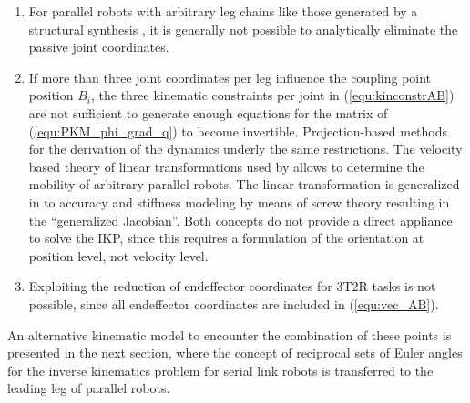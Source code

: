 \documentclass[robotics,article,submit,moreauthors,pdftex]{Definitions/mdpi}
\newcommand{\bm}[1]{\boldsymbol{#1}}
\begin{document}
\begin{enumerate}
    \item For parallel robots with arbitrary leg chains like those generated by a structural synthesis \cite{KongGos2005, Gogu2008, RamirezKotOrt2015}, it is generally not possible to analytically eliminate the passive joint coordinates.
    \item If more than three joint coordinates per leg influence the coupling point position $B_i$, the three kinematic constraints per joint in (\ref{equ:kinconstrAB}) are not sufficient to generate enough equations for the matrix of (\ref{equ:PKM_phi_grad_q}) to become invertible.
    \color{gray}Projection-based methods for the derivation of the dynamics \cite{Merlet2006,BriotKha2015,AbdellatifHei2009,DoThanhKotHeiOrt2009b} underly the same restrictions.\color{black}
    The velocity based theory of linear transformations used by \cite{Gogu2008} allows to determine the mobility of arbitrary parallel robots.
    The linear transformation is generalized in \cite{HuangLiuChe2011} to  accuracy and stiffness modeling by means of screw theory resulting in the ``generalized Jacobian''.
    Both concepts do not provide a direct appliance to solve the IKP, since this requires a formulation of the orientation at position level, not velocity level.
    \item Exploiting the reduction of endeffector coordinates for 3T2R tasks is not possible, since all endeffector coordinates are included in (\ref{equ:vec_AB}).
\end{enumerate}
%
An alternative kinematic model to encounter the combination of these points is presented in the next section, where the concept of reciprocal sets of Euler angles for the inverse kinematics problem for serial link robots \cite{1_SchapplerTapOrt2019} is transferred to the leading leg of parallel robots.

%

\end{document}
